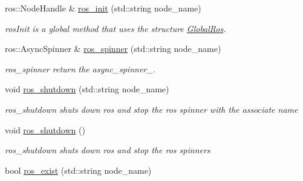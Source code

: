\begin{DoxyCompactItemize}
\item 
ros\+::\+Node\+Handle \& \hyperlink{namespacedynamic__graph_ab01ece41a91a029cf335e28548cdfc06}{ros\+\_\+init} (std\+::string node\+\_\+name)
\begin{DoxyCompactList}\small\item\em ros\+Init is a global method that uses the structure \hyperlink{structdynamic__graph_1_1GlobalRos}{Global\+Ros}. \end{DoxyCompactList}\item 
ros\+::\+Async\+Spinner \& \hyperlink{namespacedynamic__graph_a0ab97e95b56e05d30fd3112f8dfcf8eb}{ros\+\_\+spinner} (std\+::string node\+\_\+name)
\begin{DoxyCompactList}\small\item\em ros\+\_\+spinner return the async\+\_\+spinner\+\_\+. \end{DoxyCompactList}\item 
void \hyperlink{namespacedynamic__graph_a0a7d6cd6c123bd1852af188fc06ce4f7}{ros\+\_\+shutdown} (std\+::string node\+\_\+name)\hypertarget{namespacedynamic__graph_a0a7d6cd6c123bd1852af188fc06ce4f7}{}\label{namespacedynamic__graph_a0a7d6cd6c123bd1852af188fc06ce4f7}

\begin{DoxyCompactList}\small\item\em ros\+\_\+shutdown shuts down ros and stop the ros spinner with the associate name \end{DoxyCompactList}\item 
void \hyperlink{namespacedynamic__graph_a7d2045abc7e02fe4ee746c5cbb937b04}{ros\+\_\+shutdown} ()\hypertarget{namespacedynamic__graph_a7d2045abc7e02fe4ee746c5cbb937b04}{}\label{namespacedynamic__graph_a7d2045abc7e02fe4ee746c5cbb937b04}

\begin{DoxyCompactList}\small\item\em ros\+\_\+shutdown shuts down ros and stop the ros spinners \end{DoxyCompactList}\item 
bool \hyperlink{namespacedynamic__graph_ab000cd6e1e6ed365a5a3e1adddf89dff}{ros\+\_\+exist} (std\+::string node\+\_\+name)\hypertarget{namespacedynamic__graph_ab000cd6e1e6ed365a5a3e1adddf89dff}{}\label{namespacedynamic__graph_ab000cd6e1e6ed365a5a3e1adddf89dff}


\end{DoxyCompactItemize}
